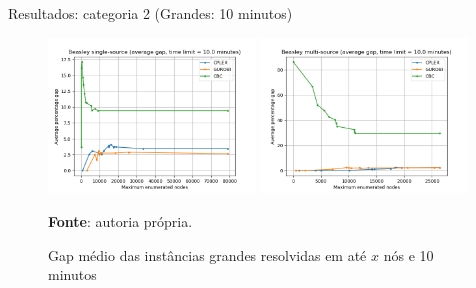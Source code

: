 \documentclass[aspectratio=169]{beamer}
\begin{document}
	\begin{frame}{Resultados: categoria 2 (Grandes: 10 minutos)} %
		
		\begin{figure}[H]
			\begin{center}
				\caption{Gap médio das instâncias grandes resolvidas em até $x$ nós e 10 minutos \cite{Beasley}}
				
				\includegraphics[width=0.49\textwidth]{res/Beasley SS large 600 - Average gap x Nodes.png}
				\includegraphics[width=0.49\textwidth]{res/Beasley MS large 600 - Average gap x Nodes.png}				
				\label{Gap:n:Beasley:600}
				
				\textbf{Fonte}: autoria própria.
			\end{center}
		\end{figure}
		
	\end{frame}
	
\end{document}
